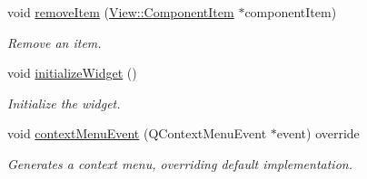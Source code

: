 \begin{Indent}
\begin{DoxyCompactItemize}
\item 
\mbox{\label{classrev_1_1_view_1_1_component_tree_widget_af96df7b462ccc09babc08923eea4a42f}} 
void \mbox{\hyperlink{classrev_1_1_view_1_1_component_tree_widget_af96df7b462ccc09babc08923eea4a42f}{remove\+Item}} (\mbox{\hyperlink{classrev_1_1_view_1_1_component_item}{View\+::\+Component\+Item}} $\ast$component\+Item)
\begin{DoxyCompactList}\small\item\em Remove an item. \end{DoxyCompactList}\item 
\mbox{\label{classrev_1_1_view_1_1_component_tree_widget_a75283573717d242403c510b6cc1c3857}} 
void \mbox{\hyperlink{classrev_1_1_view_1_1_component_tree_widget_a75283573717d242403c510b6cc1c3857}{initialize\+Widget}} ()
\begin{DoxyCompactList}\small\item\em Initialize the widget. \end{DoxyCompactList}\item 
void \mbox{\hyperlink{classrev_1_1_view_1_1_component_tree_widget_a631e57e4eb3b019dce9a0f3e3a9d8c25}{context\+Menu\+Event}} (Q\+Context\+Menu\+Event $\ast$event) override
\begin{DoxyCompactList}\small\item\em Generates a context menu, overriding default implementation. \end{DoxyCompactList}\end{DoxyCompactItemize}
\end{Indent}
